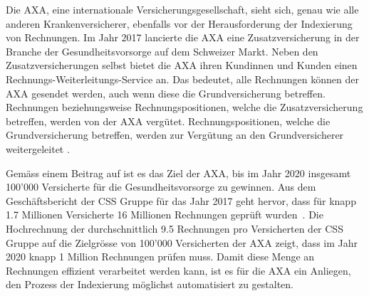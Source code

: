 


Die AXA, eine internationale Versicherungsgesellschaft, sieht sich, genau wie alle anderen Krankenversicherer, ebenfalls vor der Herausforderung der Indexierung von Rechnungen. Im Jahr 2017 lancierte die AXA eine Zusatzversicherung in der Branche der Gesundheitsvorsorge auf dem Schweizer Markt. Neben den Zusatzversicherungen selbst bietet die AXA ihren Kundinnen und Kunden einen Rechnungs-Weiterleitungs-Service an. Das bedeutet, alle Rechnungen können der AXA gesendet werden, auch wenn diese die Grundversicherung betreffen. Rechnungen beziehungsweise Rechnungspositionen, welche die Zusatzversicherung betreffen, werden von der AXA vergütet. Rechnungspositionen, welche die Grundversicherung betreffen, werden zur Vergütung an den Grundversicherer weitergeleitet \autocite{Finanzen.ch2017}.

Gemäss einem Beitrag auf \textcite{Finanzen.ch2017} ist es das Ziel der AXA, bis im Jahr 2020 insgesamt 100'000 Versicherte für die Gesundheitsvorsorge zu gewinnen. Aus dem Geschäftsbericht der CSS Gruppe für das Jahr 2017 geht hervor, dass für knapp 1.7 Millionen Versicherte 16 Millionen Rechnungen geprüft wurden~\autocite{CSSGruppe2018}. Die Hochrechnung der durchschnittlich 9.5 Rechnungen pro Versicherten der CSS Gruppe auf die Zielgrösse von 100'000 Versicherten der AXA zeigt, dass im Jahr 2020 knapp 1 Million Rechnungen prüfen muss. Damit diese Menge an Rechnungen effizient verarbeitet werden kann, ist es für die AXA ein Anliegen, den Prozess der Indexierung möglichst automatisiert zu gestalten.

